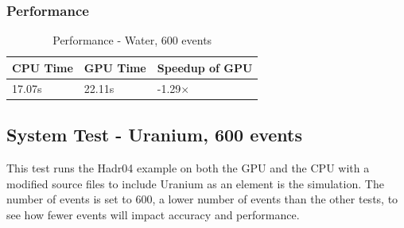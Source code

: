 \documentclass[12pt]{article}
\begin{document}
	\subsubsection{Performance}
		\begin{table}[H]
		\centering
		\caption{Performance - Water, 600 events}\label{sys3Perf}
		\begin{tabular}{lll}
		\toprule
		 \bf CPU Time&  \bf GPU Time& \bf Speedup of GPU\\\midrule
		17.07s&22.11s&-1.29$\times$\\\bottomrule
		\end{tabular}
		\end{table}
		
\subsection{System Test - Uranium, 600 events}
This test runs the Hadr04 example on both the GPU and the CPU with a modified source files to include Uranium as an element is the simulation. The number of events is set to 600, a lower number of events than the other tests, to see how fewer events will impact accuracy and performance.
\end{document}
